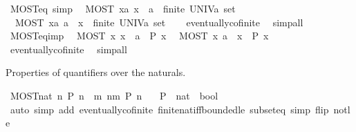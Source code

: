 \begin{isabellebody}
\ MOST{\isacharunderscore}eq\ {\isacharbrackleft}simp{\isacharbrackright}{\isacharcolon}\isanewline
\ \ {\isachardoublequoteopen}{\isacharparenleft}MOST\ x{\isacharcolon}{\isacharcolon}{\isacharprime}a{\isachardot}\ x\ {\isacharequal}\ a{\isacharparenright}\ {\isasymlongleftrightarrow}\ finite\ {\isacharparenleft}UNIV{\isacharcolon}{\isacharcolon}{\isacharprime}a\ set{\isacharparenright}{\isachardoublequoteclose}\isanewline
\ \ {\isachardoublequoteopen}{\isacharparenleft}MOST\ x{\isacharcolon}{\isacharcolon}{\isacharprime}a{\isachardot}\ a\ {\isacharequal}\ x{\isacharparenright}\ {\isasymlongleftrightarrow}\ finite\ {\isacharparenleft}UNIV{\isacharcolon}{\isacharcolon}{\isacharprime}a\ set{\isacharparenright}{\isachardoublequoteclose}\isanewline
%
\isadelimproof
\ \ %
\endisadelimproof
%
\isatagproof
{}\isamarkupfalse%
\ eventually{\isacharunderscore}cofinite\ \isamarkupfalse%
\ simp{\isacharunderscore}all%
\endisatagproof
{\isafoldproof}%
%
\isadelimproof
\isanewline
%
\endisadelimproof
\isanewline
{}\isamarkupfalse%
\ MOST{\isacharunderscore}eq{\isacharunderscore}imp{\isacharcolon}\isanewline
\ \ {\isachardoublequoteopen}MOST\ x{\isachardot}\ x\ {\isacharequal}\ a\ {\isasymlongrightarrow}\ P\ x{\isachardoublequoteclose}\isanewline
\ \ {\isachardoublequoteopen}MOST\ x{\isachardot}\ a\ {\isacharequal}\ x\ {\isasymlongrightarrow}\ P\ x{\isachardoublequoteclose}\isanewline
%
\isadelimproof
\ \ %
\endisadelimproof
%
\isatagproof
{}\isamarkupfalse%
\ eventually{\isacharunderscore}cofinite\ \isamarkupfalse%
\ simp{\isacharunderscore}all%
\endisatagproof
{\isafoldproof}%
%
\isadelimproof
%
\endisadelimproof
%
\begin{isamarkuptext}%
Properties of quantifiers over the naturals.%
\end{isamarkuptext}\isamarkuptrue%
\isamarkupfalse%
\ MOST{\isacharunderscore}nat{\isacharcolon}\ {\isachardoublequoteopen}{\isacharparenleft}{\isasymforall}\isactrlsub {\isasyminfinity}n{\isachardot}\ P\ n{\isacharparenright}\ {\isasymlongleftrightarrow}\ {\isacharparenleft}{\isasymexists}m{\isachardot}\ {\isasymforall}n{\isachargreater}m{\isachardot}\ P\ n{\isacharparenright}{\isachardoublequoteclose}\isanewline
\ \ \ P\ {\isacharcolon}{\isacharcolon}\ {\isachardoublequoteopen}nat\ {\isasymRightarrow}\ bool{\isachardoublequoteclose}\isanewline
%
\isadelimproof
\ \ %
\endisadelimproof
%
\isatagproof
{}\isamarkupfalse%
\ {\isacharparenleft}auto\ simp\ add{\isacharcolon}\ eventually{\isacharunderscore}cofinite\ finite{\isacharunderscore}nat{\isacharunderscore}iff{\isacharunderscore}bounded{\isacharunderscore}le\ subset{\isacharunderscore}eq\ simp\ flip{\isacharcolon}\ not{\isacharunderscore}le{\isacharparenright}%

\end{isabellebody}
